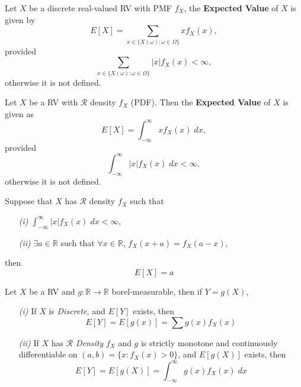 \documentclass{tufte-handout}
\begin{document}
\begin{definition}
  Let $X$ be a discrete real-valued RV with PMF $f_X$, the \textbf{Expected Value} of $X$ is given by 
  $$E[X] = \sum_{x \in \{ X(\omega) : \omega \in \Omega \}} x f_X (x), $$
provided
$$ \sum_{x \in \{ X(\omega) : \omega \in \Omega \}} |x| f_X (x) < \infty, $$
otherwise it is not defined.
\end{definition}
\begin{definition}
  Let $X$ be a RV with $\mathcal{R}$ density $f_X$ (PDF). Then the \textbf{Expected Value} of $X$ is given as 
  $$E[X] = \int_{-\infty}^{\infty} x f_X (x) \;dx,$$
  provided 
  $$\int_{-\infty}^{\infty} |x| f_X (x) \;dx < \infty, $$
  otherwise it is not defined.

\end{definition}
\begin{lemma}
  Suppose that $X$ has $\mathcal{R}$ density $f_X$ such that 
  \begin{enumerate}
    \item[\it (i)]  $\int_{-\infty}^{\infty} |x| f_X (x) \;dx < \infty, $
    \item[\it (ii)] $\exists a \in \mathbb{R}$ such that $\forall x \in \mathbb{R}$, $f_X(x +a) = f_X(a -x)$,
 
  \end{enumerate}
   then $$E[X] =a $$
\end{lemma}
\begin{theorem}
  Let $X$ be a RV and $g: \mathbb{R}\to \mathbb{R}$ borel-measurable, then if $Y = g(X)$, 
  \begin{enumerate}
    \item[\it (i)] If $X$ is \textit{Discrete,} and $E[Y]$ exists, then 
    $$E[Y] = E[g(x)] = \sum g(x) f_X (x) $$
    \item[\it (ii)] If $X$ has $\mathcal{R}$ \textit{Density} $f_X$ and $g$ is strictly monotone and continuously differentiable on $(a,b) = \{ x : f_X(x) > 0 \}$, and $E[g(X)]$ exists, then 
    $$E[Y] = E[g(X)] = \int_{-\infty}^{\infty} g(x) f_X(x) \; dx $$
  \end{enumerate}
  
\end{theorem}
\end{document}
